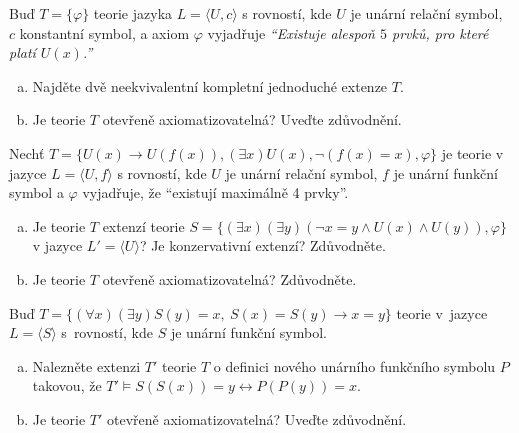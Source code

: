 \begin{problem}

    Buď $T=\{\varphi\}$ teorie jazyka $L=\langle U, c \rangle$ s rovností, kde $U$ je unární relační symbol, $c$ konstantní symbol, a axiom $\varphi$ vyjadřuje \emph{``Existuje alespoň $5$ prvků, pro které platí $U(x)$.''}
    \begin{enumerate}[(a)]
        \item Najděte dvě neekvivalentní kompletní jednoduché extenze $T$.
        \item Je teorie $T$ otevřeně axiomatizovatelná? Uveďte zdůvodnění.
    \end{enumerate}

\end{problem}


\begin{problem}

    Nechť $T = \{U(x) \to U(f(x)), (\exists x)U(x), \neg (f(x) = x), \varphi\}$ je teorie v jazyce $L = \langle U, f \rangle$ s rovností, kde $U$ je unární relační symbol, $f$ je unární funkční symbol a $\varphi$ vyjadřuje, že ``existují maximálně 4 prvky''.
    \begin{enumerate}[(a)]
        \item Je teorie $T$ extenzí teorie $S = \{ (\exists x)(\exists y)(\neg x = y \land U(x) \land U(y)), \varphi \}$ v jazyce $L' = \langle U \rangle$? Je konzervativní extenzí? Zdůvodněte.
        \item Je teorie $T$ otevřeně axiomatizovatelná? Zdůvodněte.    
    \end{enumerate}
\end{problem}


\begin{problem}

    Buď $T=\{(\forall x)(\exists y) S(y)=x,\ S(x)=S(y)\to x=y\}$ teorie v~jazyce $L=\langle S\rangle$ s~rovností, kde $S$ je unární funkční symbol.
    \begin{enumerate}[(a)]
        \item Nalezněte extenzi $T'$ teorie $T$ o definici nového unárního funkčního symbolu $P$ takovou, že $T' \models S(S(x))=y \leftrightarrow P(P(y))=x$.
        \item Je teorie $T'$ otevřeně axiomatizovatelná? Uveďte zdůvodnění.
    \end{enumerate}

\end{problem} 


